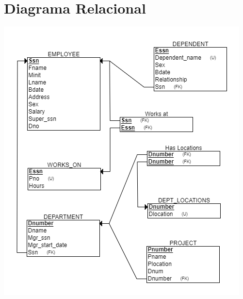 \documentclass[a4paper,12pt]{article}
\begin{document}
\section*{Diagrama Relacional}
\begin{center}
    \includegraphics[scale = 1]{IMA/imageSC.png}
\end{center}

\end{document}
